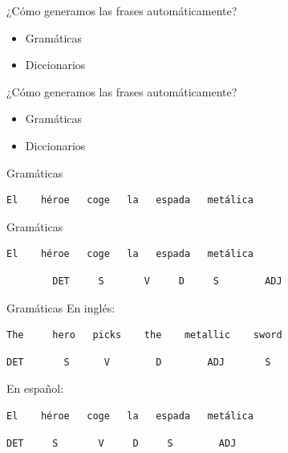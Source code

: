 \begin{tframe}{¿Cómo generamos las frases automáticamente?}
	\begin{itemize}
		\item Gramáticas
		\item Diccionarios
	\end{itemize}
\end{tframe}

\begin{tframe}{¿Cómo generamos las frases automáticamente?}
	\begin{itemize}
		\item<+-| alert@+> Gramáticas
		\item Diccionarios
	\end{itemize}
\end{tframe}

\begin{frame}[t, fragile]{Gramáticas}
	\vspace*{\fill}
	\begin{Verbatim}
El    héroe   coge   la   espada   metálica
	\end{Verbatim}
	\vspace*{\fill}
\end{frame}

\begin{frame}[t, fragile]{Gramáticas}
	\vspace*{\fill}
	\begin{Verbatim}
El    héroe   coge   la   espada   metálica
	\end{Verbatim}
	\begin{verbatim}
		DET     S       V     D     S        ADJ
	\end{verbatim}
	\vspace*{\fill}
\end{frame}

\begin{frame}[t, fragile]{Gramáticas}
En inglés:

	\begin{Verbatim}
The     hero   picks    the    metallic    sword
	\end{Verbatim}
	\begin{Verbatim}
DET       S      V        D        ADJ       S
	\end{Verbatim}
\vspace*{12px}
En español:
	\begin{Verbatim}
El    héroe   coge   la   espada   metálica
	\end{Verbatim}
	\begin{Verbatim}
DET     S       V     D     S        ADJ
	\end{Verbatim}
\end{frame}

